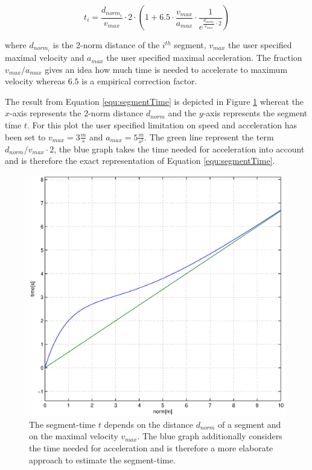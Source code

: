 \begin{equation}
t_i = \frac{d_{norm_i}}{v_{max}} \cdot 2 \cdot \left( 1 + 6.5 \cdot \frac {v_{max}}{a_{max}} \cdot \frac{1}{e^{\frac{d_{norm_i}}{v_{max}} \cdot 2}} \right)
\label{equ:segmentTime}
\end{equation}

where $d_{norm_i}$ is the 2-norm distance of the $i^{th}$ segment, $v_{max}$ the user specified maximal velocity and $a_{max}$ the user specified maximal acceleration. The fraction $v_{max}/a_{max}$ gives an idea how much time is needed to accelerate to maximum velocity whereas $6.5$ is a empirical correction factor. \newline

The result from Equation \ref{equ:segmentTime} is depicted in Figure \ref{pic:timeEstimation} whereat the $x$-axis represents the 2-norm distance $d_{norm}$ and the $y$-axis represents the segment time $t$. For this plot the user specified limitation on speed and acceleration has been set to $v_{max} = 3 \frac{m}{s}$ and $a_{max} = 5 \frac{m}{s^2}$. The green line represent the term $d_{norm}/v_{max} \cdot 2$, the blue graph takes the time needed for acceleration into account and is therefore the exact representation of Equation \ref{equ:segmentTime}. \newline

\begin{figure}[h]
   \centering
   \includegraphics[width=1\textwidth]{pics/time_estimation.eps}
   \caption{The segment-time $t$ depends on the distance $d_{norm}$ of a segment and on the maximal velocity $v_{max}$. The blue graph additionally considers the time needed for acceleration and is therefore a more elaborate approach to estimate the segment-time.}
   \label{pic:timeEstimation}
\end{figure}

